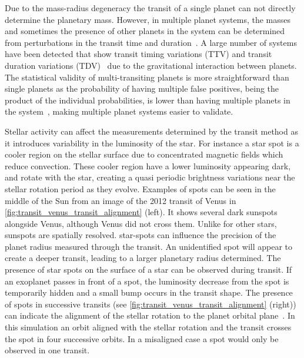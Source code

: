 Due to the mass-radius degeneracy the transit of a single planet can not directly determine the planetary mass.
However, in multiple planet systems, the masses and sometimes the presence of other planets in the system can be determined from perturbations in the transit time and duration~\citep[e.g.][]{holman_use_2005, holman_kepler9_2010}.
A large number of systems have been detected that show transit timing variations (TTV) and transit duration variations (TDV)~\citep[e.g.][]{holczer_transit_2016} due to the gravitational interaction between planets.
The statistical validity of multi-transiting planets is more straightforward than single planets as the probability of having multiple false positives, being the product of the individual probabilities, is lower than having multiple planets in the system~\citep{lissauer_almost_2012}, making multiple planet systems easier to validate.

Stellar activity can affect the measurements determined by the transit method as it introduces variability in the luminosity of the star.
For instance a star spot is a cooler region on the stellar surface due to concentrated magnetic fields which reduce convection.
These cooler region have a lower luminosity appearing dark, and rotate with the star, creating a quasi periodic brightness variations near the stellar rotation period as they evolve.
Examples of spots can be seen in the middle of the Sun from an image of the 2012 transit of Venus in \cref{fig:transit_venus_transit_alignment} (left).
It shows several dark sunspots alongside Venus, although Venus did not cross them.
Unlike for other stars, sunspots are spatially resolved.
star-spots can influence the precision of the planet radius measured through the transit.
An unidentified spot will appear to create a deeper transit, leading to a larger planetary radius determined. 
The presence of star spots on the surface of a star can be observed during transit.
If an exoplanet passes in front of a spot, the luminosity decrease from the spot is temporarily hidden and a small bump occurs in the transit shape.
The presence of spots in successive transits (see \cref{fig:transit_venus_transit_alignment} (right)) can indicate the alignment of the stellar rotation to the planet orbital plane~\citep{sanchis-ojeda_starspots_2013}.
In this simulation an orbit aligned with the stellar rotation and the transit crosses the spot in four successive orbits.
In a misaligned case a spot would only be observed in one transit.

